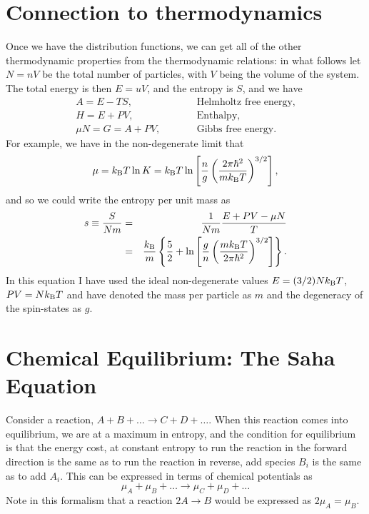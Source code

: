 \section{Connection to thermodynamics}
Once we have the distribution functions, we can get all of the other thermodynamic properties from the thermodynamic relations: in what follows let $N = nV$ be the total number of particles, with $V$ being the volume of the system.  The total energy is then $E = uV$, and the entropy is $S$, and we have
\begin{eqnarray}
A = E - TS, &\qquad& \textrm{Helmholtz free energy,}\\
H = E + PV, &\qquad& \textrm{Enthalpy,}\\
\mu N = G = A + PV, &\qquad& \textrm{Gibbs free energy}.
\end{eqnarray}
For example, we have in the non-degenerate limit that
\begin{equation}\label{e.chem-pot-ideal-gas}
\mu = k_\mathrm{B} T\ln K = k_\mathrm{B} T\ln\left[ \frac{n}{g}\left(\frac{2\pi\hbar^{2}}{mk_\mathrm{B} T}\right)^{3/2}\right],
\end{equation}
and so we could write the entropy per unit mass as
\begin{eqnarray}
s \equiv \frac{S}{Nm} &=& \frac{1}{Nm}\frac{E + PV - \mu N}{T}\nonumber\\
 &=& \frac{k_\mathrm{B} }{m}\left\{ \frac{5}{2} + \ln\left[\frac{g}{n}\left(\frac{mk_\mathrm{B} T}{2\pi\hbar^{2}}\right)^{3/2}\right]\right\}.
\label{e.sacker-tetrode}
 \end{eqnarray}
In this equation I have used the ideal non-degenerate values $E = (3/2) Nk_\mathrm{B} T$, $PV = Nk_\mathrm{B} T$ and have denoted the mass per particle as $m$ and the degeneracy of the spin-states as $g$.

\section{Chemical Equilibrium: The Saha Equation}

Consider a reaction, $A + B + \ldots \to C + D + \ldots$. When this reaction comes into equilibrium, we are at a maximum in entropy, and the condition for equilibrium is that the energy cost, at constant entropy to run the reaction in the forward direction is the same as to run the reaction in reverse, add species $B_{i}$ is the same as to add $A_{i}$.  This can be expressed in terms of chemical potentials as
\begin{equation}\label{e.mass-action}
\mu_{A} + \mu_{B} + \ldots \to \mu_{C} + \mu_{D} + \ldots
\end{equation}
Note in this formalism that a reaction $2A \to B$ would be expressed as $2\mu_{A} = \mu_{B}$.

